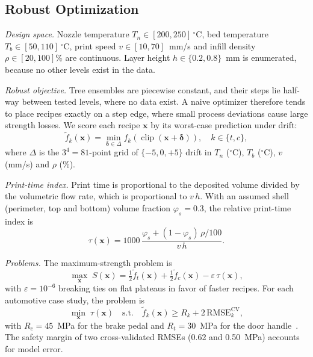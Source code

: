 \documentclass[conference,12pt]{IEEEtran}
\newcommand{\degC}{\ensuremath{^{\circ}}C}
\begin{document}
\subsection{Robust Optimization}
\textit{Design space.} Nozzle temperature $T_n \in [200, 250]$\,\degC, bed temperature $T_b \in [50, 110]$\,\degC, print speed $v \in [10, 70]$~mm/s and infill density $\rho \in [20, 100]$\% are continuous. Layer height $h \in \{0.2, 0.8\}$~mm is enumerated, because no other levels exist in the data.

\textit{Robust objective.} Tree ensembles are piecewise constant, and their steps lie half-way between tested levels, where no data exist. A naive optimizer therefore tends to place recipes exactly on a step edge, where small process deviations cause large strength losses. We score each recipe $\mathbf{x}$ by its worst-case prediction under drift:
\begin{equation}
\tilde{f}_k(\mathbf{x}) = \min_{\boldsymbol{\delta} \in \Delta} f_k\!\left(\operatorname{clip}(\mathbf{x} + \boldsymbol{\delta})\right), \quad k \in \{t, c\},
\end{equation}
where $\Delta$ is the $3^4 = 81$-point grid of $\{-5, 0, +5\}$ drift in $T_n$ (\degC), $T_b$ (\degC), $v$ (mm/s) and $\rho$ (\%).

\textit{Print-time index.} Print time is proportional to the deposited volume divided by the volumetric flow rate, which is proportional to $v\,h$. With an assumed shell (perimeter, top and bottom) volume fraction $\varphi_s = 0.3$, the relative print-time index is
\begin{equation}
\tau(\mathbf{x}) = 1000\,\frac{\varphi_s + (1 - \varphi_s)\,\rho/100}{v\,h}.
\label{eq:tau}
\end{equation}

\textit{Problems.} The maximum-strength problem is
\begin{equation}
\max_{\mathbf{x}}\; S(\mathbf{x}) = \tfrac{1}{2}\tilde{f}_t(\mathbf{x}) + \tfrac{1}{2}\tilde{f}_c(\mathbf{x}) - \varepsilon\,\tau(\mathbf{x}),
\end{equation}
with $\varepsilon = 10^{-6}$ breaking ties on flat plateaus in favor of faster recipes. For each automotive case study, the problem is
\begin{equation}
\min_{\mathbf{x}}\; \tau(\mathbf{x}) \quad \text{s.t.} \quad \tilde{f}_k(\mathbf{x}) \geq R_k + 2\,\mathrm{RMSE}_k^{\mathrm{CV}},
\end{equation}
with $R_c = 45$~MPa for the brake pedal and $R_t = 30$~MPa for the door handle~\cite{munshi2026}. The safety margin of two cross-validated RMSEs (0.62 and 0.50~MPa) accounts for model error.
\end{document}
